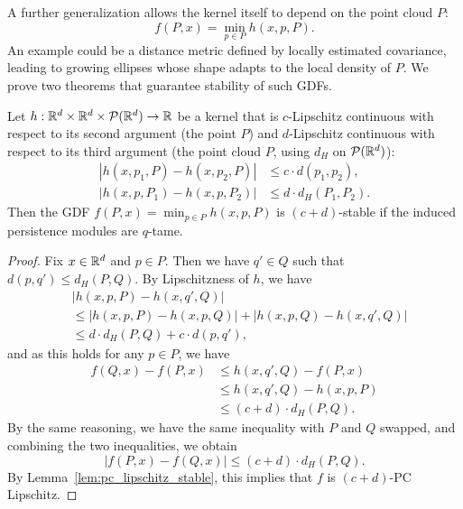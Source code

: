 A further generalization allows the kernel itself to depend on the point cloud
$P$:
\begin{equation}
    f(P, x) = \min_{p \in P} h(x, p, P).
\end{equation}
An example could be a distance metric defined by locally estimated covariance,
leading to growing ellipses whose shape adapts to the local density of $P$. We
prove two theorems that guarantee stability of such GDFs.
\begin{theorem}
    Let $h : \mathbb{R}^d \times \mathbb{R}^d \times \mathcal{P}(\mathbb{R}^d) \to \mathbb{R}$ be a kernel that
    is $c$-Lipschitz continuous with respect to its second argument (the point
    $P$) and $d$-Lipschitz continuous with respect to its third argument (the
    point cloud $P$, using $d_H$ on $\mathcal{P}(\mathbb{R}^d)$):
    \begin{align}
        |h(x, p_1, P) - h(x, p_2, P)| & \leq c \cdot d(p_1, p_2), \\
        |h(x, p, P_1) - h(x, p, P_2)| & \leq d \cdot d_H(P_1, P_2).
    \end{align}
    Then the GDF $f(P, x) = \min_{p\in P} h(x, p, P)$ is $(c + d)$-stable if
    the induced persistence modules are $q$-tame.
\end{theorem}
\begin{proof}
    Fix $x \in \mathbb{R}^d$ and $p \in P$. Then we have $q' \in Q$ such that $d(p, q')
    \leq d_H(P, Q)$. By Lipschitzness of $h$, we have
    \begin{align}
        & |h(x, p, P) - h(x, q', Q)| \\
        & \leq |h(x, p, P) - h(x, p, Q)| + |h(x, p, Q) - h(x, q', Q)| \\
        & \leq d \cdot d_H(P, Q) + c \cdot d(p, q'),
    \end{align}
    and as this holds for any $p \in P$, we have
    \begin{align}
        f(Q, x) - f(P, x) & \leq h(x, q', Q) - f(P, x) \\
        & \leq h(x, q', Q) - h(x, p, P) \\
        & \leq (c + d) \cdot d_H(P, Q).
    \end{align}
    By the same reasoning, we have the same inequality with $P$ and $Q$ swapped,
    and combining the two inequalities, we obtain
    \begin{equation}
        |f(P, x) - f(Q, x)| \leq (c + d) \cdot d_H(P, Q).
    \end{equation}
    By Lemma~\ref{lem:pc_lipschitz_stable}, this implies that $f$ is
    $(c + d)$-PC Lipschitz.
\end{proof}

